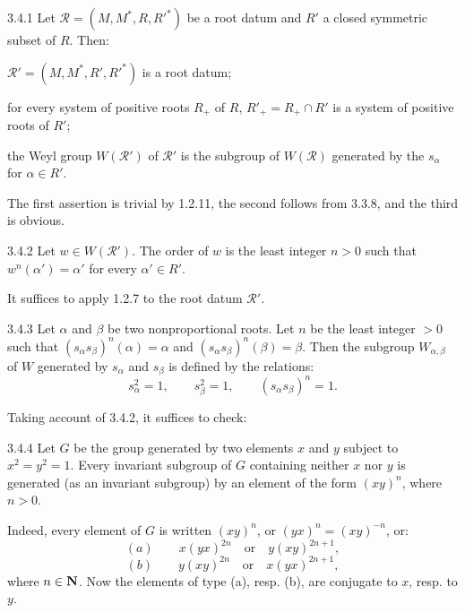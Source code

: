 \begin{proposition}{3.4.1}\label{XXI.3.4.1}
Let $\mathcal R=(M,M^*,R,R'^*)$ be a root datum and $R'$ a closed symmetric subset of $R$. Then:
\begin{enumeratei}
\item $\mathcal R'=(M,M^*,R',R'^*)$ is a root datum;
\item for every system of positive roots $R_+$ of $R$, $R'_+=R_+\cap R'$ is a system of positive roots of $R'$;
\item the Weyl group $W(\mathcal R')$ of $\mathcal R'$ is the subgroup of $W(\mathcal R)$ generated by the $s_\alpha$ for $\alpha\in R'$.
\end{enumeratei}
\end{proposition}
The first assertion is trivial by 1.2.11, the second follows from 3.3.8, and the third is obvious.
\begin{corollary}{3.4.2}\label{XXI.3.4.2}
Let $w\in W(\mathcal R')$. The order of $w$ is the least integer $n>0$ such that $w^n(\alpha')=\alpha'$ for every $\alpha'\in R'$.
\end{corollary}
It suffices to apply 1.2.7 to the root datum $\mathcal R'$.
\begin{corollary}{3.4.3}\label{XXI.3.4.3}
Let $\alpha$ and $\beta$ be two nonproportional roots. Let $n$ be the least integer $>0$ such that $(s_\alpha s_\beta)^n(\alpha)=\alpha$ and $(s_\alpha s_\beta)^n(\beta)=\beta$. Then the subgroup $W_{\alpha,\beta}$ of $W$ generated by $s_\alpha$ and $s_\beta$ is defined by the relations:
\[
s_\alpha^2=1,\qquad s_\beta^2=1,\qquad(s_\alpha s_\beta)^n=1.
\]
\end{corollary}
Taking account of 3.4.2, it suffices to check:
\begin{lemma}{3.4.4}\label{XXI.3.4.4}
Let $G$ be the group generated by two elements $x$ and $y$ subject to $x^2=y^2=1$. Every invariant subgroup of $G$ containing neither $x$ nor $y$ is generated (as an invariant subgroup) by an element of the form $(xy)^n$, where $n>0$.
\end{lemma}
{\renewcommand{\thefootnote}{(10)}}%
Indeed, every element of $G$ is written $(xy)^n$, or $(yx)^n=(xy)^{-n}$, or:
\[
(a)\qquad x(yx)^{2n}\quad\text{or}\quad y(xy)^{2n+1},
\]
\[
(b)\qquad y(xy)^{2n}\quad\text{or}\quad x(yx)^{2n+1},
\]
where $n\in\mathbf{N}$. Now the elements of type (a), resp. (b), are conjugate to $x$, resp. to $y$.
